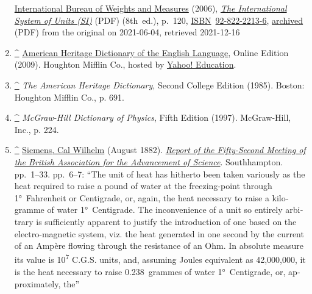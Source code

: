\documentclass[
]{article}
\newenvironment{LTR}{\beginL}{\endL}
\begin{document}
\begin{LTR}
\begin{otherlanguage}{english}
\begin{enumerate}
  \href{/wiki/International_Bureau_of_Weights_and_Measures}{International
  Bureau of Weights and Measures} (2006),
  \href{https://www.bipm.org/documents/20126/41483022/si_brochure_8.pdf}{\emph{The
  International System of Units (SI)}} {(PDF)} (8th~ed.), p.~120,
  \href{/wiki/ISBN_(identifier)}{ISBN}~\href{/wiki/Special:BookSources/92-822-2213-6}{92-822-2213-6},
  \href{https://web.archive.org/web/20210604163219/https://www.bipm.org/documents/20126/41483022/si_brochure_8.pdf}{archived}
  {(PDF)} from the original on 2021-06-04{, retrieved {2021-12-16}}{}
\item
  \label{cite_note-2}{{\textbf{\hyperref[cite_ref-2]{\^{}}}}
  {\href{https://web.archive.org/web/20060413141420/http://education.yahoo.com/reference/dictionary/entry/joule}{American
  Heritage Dictionary of the English Language}, Online Edition (2009).
  Houghton Mifflin Co., hosted by
  \href{https://web.archive.org/web/20010502171832/http://education.yahoo.com/}{Yahoo!
  Education}.}}
\item
  \label{cite_note-3}{{\textbf{\hyperref[cite_ref-3]{\^{}}}}
  {\emph{The American Heritage Dictionary}, Second College Edition
  (1985). Boston: Houghton Mifflin Co., p. 691.}}
\item
  \label{cite_note-4}{{\textbf{\hyperref[cite_ref-4]{\^{}}}}
  {\emph{McGraw-Hill Dictionary of Physics}, Fifth Edition (1997).
  McGraw-Hill, Inc., p. 224.}}
\item
  \label{cite_note-5}{{\textbf{\hyperref[cite_ref-5]{\^{}}}}
  {\href{/wiki/Carl_Wilhelm_Siemens}{Siemens, Cal Wilhelm} (August
  1882).
  \href{http://gallica.bnf.fr/ark:/12148/bpt6k781656}{\emph{Report of
  the Fifty-Second Meeting of the British Association for the
  Advancement of Science}}. Southhampton. pp.~1--33. pp.~6--7: ``The
  unit of heat has hitherto been taken variously as the heat required to
  raise a pound of water at the freezing-point through 1°~Fahrenheit or
  Centigrade, or, again, the heat necessary to raise a kilogramme of
  water 1°~Centigrade. The inconvenience of a unit so entirely arbitrary
  is sufficiently apparent to justify the introduction of one based on
  the electro-magnetic system, viz. the heat generated in one second by
  the current of an Ampère flowing through the resistance of an Ohm. In
  absolute measure its value is 10\textsuperscript{7} C.G.S. units, and,
  assuming Joule\textquotesingle s equivalent as 42,000,000, it is the
  heat necessary to raise 0.238~grammes of water 1°~Centigrade, or,
  approximately, the'' }}


\end{enumerate}
\end{otherlanguage}
\end{LTR}
\end{document}
